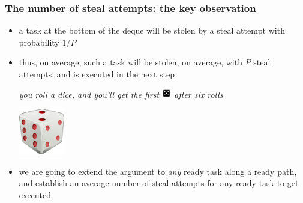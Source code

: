\documentclass[12pt,dvipdfmx]{beamer}
\newcommand{\ao}[1]{{\color{blue}#1}}
\begin{document}
\begin{frame}
\frametitle{The number of steal attempts: the key observation}

\begin{itemize}
\item<1-> a task at the bottom of the deque will be
  stolen by a steal attempt with probability
  $1/P$

\item<2-> thus, on average, such a task will be stolen,
  on average, with $P$ steal attempts, and is executed
  in the next step

{\emph{\ao{you roll a dice, and you'll get the first 
\includegraphics[width=4mm]{out/pdf/svg/dice5.pdf}
after six rolls}}}

\begin{center}
\def\svgwidth{0.4\textwidth}
{\scriptsize}\hspace{1cm}\includegraphics[width=2cm]{out/pdf/svg/dice.pdf}
\end{center}

\item<3-> we are going to extend the argument to {\em
    any} ready task along a ready path, and establish an
  average number of steal attempts for any ready
  task to get executed
\end{itemize}
\end{frame}
\end{document}
